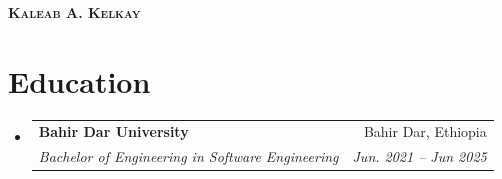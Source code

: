 \documentclass[letterpaper,11pt]{article}
\makeatletter
\newcommand{\resumeSubheading}[4]{
  \vspace{-2pt}\item
    \begin{tabular*}{0.97\textwidth}[t]{l@{\extracolsep{\fill}}r}
      \textbf{#1} & #2 \\
      \textit{\small#3} & \textit{\small #4} \\
    \end{tabular*}\vspace{-7pt}
}
\newcommand{\resumeSubHeadingListStart}{\begin{itemize}[leftmargin=0.15in, label={}]}
\newcommand{\resumeSubHeadingListEnd}{\end{itemize}}
\makeatother
\begin{document}

\begin{center}
    \textbf{\Huge \scshape Kaleab A. Kelkay} \\ \vspace{1pt}
\end{center}


\section{Education}
  \resumeSubHeadingListStart
    \resumeSubheading
      {Bahir Dar University}{Bahir Dar, Ethiopia}
      {Bachelor of Engineering in Software Engineering}{Jun. 2021 -- Jun 2025}
  \resumeSubHeadingListEnd


\end{document}
